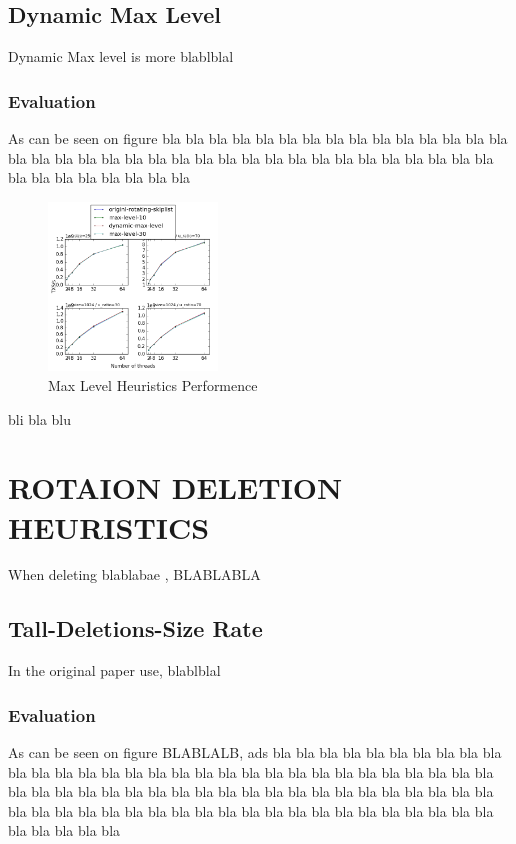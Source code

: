 \documentclass{article}
\begin{document}
\subsection{Dynamic Max Level}
\label{ssec:dml}

Dynamic Max level is more blablblal

\subsubsection{Evaluation}
\label{sssec:ml-evl}

As can be seen on figure bla bla bla bla bla 
bla bla bla bla bla bla
bla bla bla bla bla 
bla bla bla bla bla bla
bla bla bla bla bla 
bla bla bla bla bla bla
bla bla bla bla bla 
bla bla bla bla bla bla

\begin{figure}
	\caption{Max Level Heuristics Performence}
	\centering
	\includegraphics[width=0.4\textwidth]{max-level_plot}
\end{figure}

bli bla blu

\section{ROTAION DELETION HEURISTICS}
\label{sec:rdh}

When deleting blablabae , BLABLABLA

\subsection{Tall-Deletions-Size Rate}
\label{ssec:tds}

In the original paper use, blablblal

\subsubsection{Evaluation}
\label{sssec:tds-evl}

As can be seen on figure BLABLALB, ads
bla bla bla bla bla bla
bla bla bla bla bla 
bla bla bla bla bla bla
bla bla bla bla bla 
bla bla bla bla bla bla
bla bla bla bla bla 
bla bla bla bla bla bla
bla bla bla bla bla bla
bla bla bla bla bla 
bla bla bla bla bla bla
bla bla bla bla bla 
bla bla bla bla bla bla
bla bla bla bla bla 
bla bla bla bla bla bla
\end{document}
